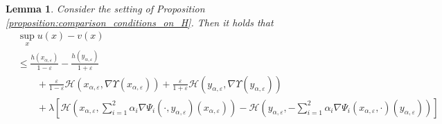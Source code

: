 \documentclass[a4paper]{article}
\newcommand{\cH}{\mathcal{H}}
\numberwithin{equation}{section}
\newtheorem{lemma}[theorem]{Lemma}
\theoremstyle{definition}
\begin{document}
\begin{lemma} \label{lemma:establish_first_bound_viscosity_argument}
	Consider the setting of Proposition \ref{proposition:comparison_conditions_on_H}. Then it holds that 
	\begin{align*} 
		& \sup_x u(x) - v(x) \nonumber\\
		& \leq \frac{h(x_{\alpha,\varepsilon})}{1 - \varepsilon} - \frac{h(y_{\alpha,\varepsilon})}{1+\varepsilon}  \\
		& \qquad + \frac{\varepsilon}{1-\varepsilon}\cH(x_{\alpha,\varepsilon}, \nabla \Upsilon(x_{\alpha,\varepsilon})) + \frac{\varepsilon}{1+\varepsilon}\cH(y_{\alpha,\varepsilon}, \nabla\Upsilon(y_{\alpha,\varepsilon})) \\
		& \qquad +  \lambda \left[\cH\left(x_{\alpha,\varepsilon}, \sum_{i=1}^2 \alpha_i\nabla\Psi_i(\cdot,y_{\alpha,\varepsilon})(x_{\alpha,\varepsilon})\right) - \cH\left(y_{\alpha,\varepsilon},- \sum_{i=1}^2 \alpha_i\nabla\Psi_i(x_{\alpha,\varepsilon},\cdot)(y_{\alpha,\varepsilon})\right)\right]  
	\end{align*}
\end{lemma}
\end{document}
